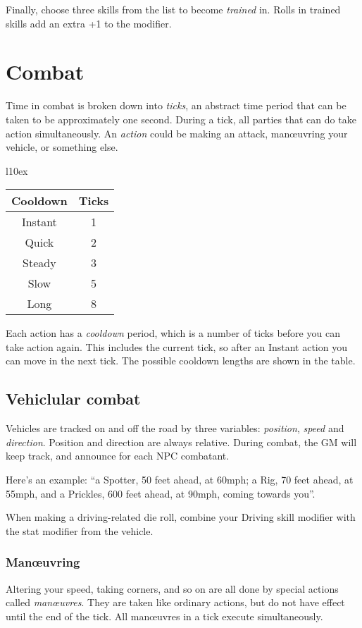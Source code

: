\documentclass[10pt, a4paper, twocolumn]{article}
\begin{document}
Finally, choose three skills from the list to become \emph{trained} in. Rolls in
trained skills add an extra +1 to the modifier.

\section{Combat}
Time in combat is broken down into \emph{ticks}, an abstract time period that
can be taken to be approximately one second. During a tick, all parties that
can do take action simultaneously. An \emph{action} could be making an attack,
man\oe{}uvring your vehicle, or something else.

\begin{wraptable}[6]{l}{10ex}
  \small
\vspace*{-3.5ex}
\hspace*{-4ex}
\begin{tabular}{cc}
  Cooldown & Ticks \\
  \hline 
  Instant  & 1     \\
  Quick    & 2     \\
  Steady   & 3     \\
  Slow     & 5     \\
  Long     & 8
\end{tabular}
\end{wraptable}

Each action has a \emph{cooldown} period, which is a number of ticks before you
can take action again. This includes the current tick, so after an Instant
action you can move in the next tick. The possible cooldown lengths are shown in
the table. 

\subsection{Vehiclular combat}
Vehicles are tracked on and off the road by three variables: \emph{position},
\emph{speed} and \emph{direction}. Position and direction are always relative.
During combat, the GM will keep track, and announce for each NPC combatant.

Here's an example: ``a Spotter, 50 feet ahead, at 60mph; a Rig, 70 feet ahead,
at 55mph, and a Prickles, 600 feet ahead, at 90mph, coming towards you''.

When making a driving-related die roll, combine your Driving skill modifier with
the stat modifier from the vehicle.

\subsubsection{Man\oe{}uvring}
Altering your speed, taking corners, and so on are all done by special actions
called \emph{man\oe{}uvres}. They are taken like ordinary actions, but do not
have effect until the end of the tick. All man\oe{}uvres in a tick execute
simultaneously. 
\end{document}
